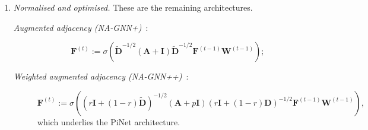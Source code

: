 \begin{enumerate}
\item \emph{Normalised and optimised.} These are the remaining architectures.
\begin{description}
\item[\textit{Augmented adjacency (NA-GNN+)}~\cite{kipf-loose}:] %
$$
\mathbf{F}^{(t)}:=\sigma\left(\tilde{\mathbf{D}}^{-1/2}(\mathbf{A}+\mathbf{I})\tilde{\mathbf{D}}^{-1/2}\mathbf{F}^{(t-1)}\mathbf{W}^{(t-1)}\right);
$$
\item[\textit{Weighted augmented adjacency (NA-GNN++)}~\cite{DBLP:journals/corr/abs-1905-03046}:]
$$\mathbf{F}^{(t)}:=\sigma\left((r\mathbf{I}+(1-r)\tilde{\mathbf{D}})^{-1/2}(\mathbf{A}+p\mathbf{I})(r\mathbf{I}+(1-r)\mathbf{D})^{-1/2}\mathbf{F}^{(t-1)}\mathbf{W}^{(t-1)}\right),
$$
which underlies the PiNet architecture.
\end{description}
\end{enumerate}

